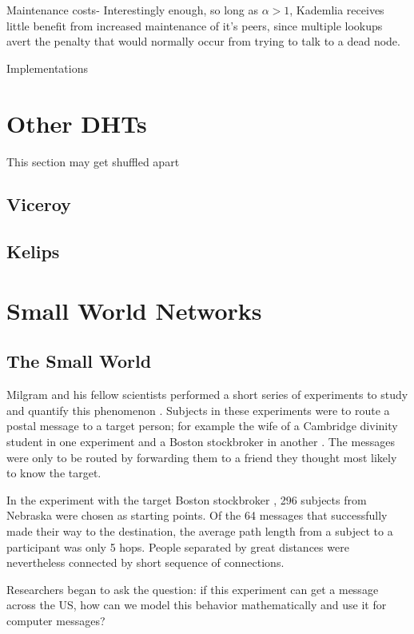 \documentclass[10pt,letterpaper]{report}
\begin{document}
Maintenance costs-  Interestingly enough, so long as $\alpha >1$, Kademlia receives little benefit from increased maintenance of it's peers, since multiple lookups avert the penalty that would normally occur from trying to talk to a dead node.


Implementations




\chapter{Other DHTs}
This section may get shuffled apart

\section{Viceroy}
\section{Kelips}










\chapter{Small World Networks}
\section{The Small World}


Milgram and his fellow scientists performed a short series of experiments to study and quantify this phenomenon \cite{milgram1967small}.  
Subjects in these experiments were to route a postal message to a target person; for example the wife of a Cambridge divinity student in one experiment and a Boston stockbroker in another \cite{milgram1967small}.
The messages were only to be routed by forwarding them to a friend they thought most likely to know the target.

In the experiment with the target Boston stockbroker \cite{travers1969experimental}, 296 subjects from Nebraska were chosen as starting points.
Of the 64 messages that successfully made their way to the destination, the average path length from a subject to a participant was only 5 hops.  
People separated by great distances were nevertheless connected by short sequence of connections.

Researchers began to ask the question: if this experiment can get a message across the US, how can we model this behavior mathematically and use it for computer messages?
\end{document}
